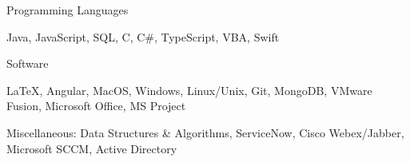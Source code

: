 \begin{cventries}
  \cventry
    {Programming Languages}
    { }
    { }
    { }
    {
      \begin{cvitems}
        \item {Java, JavaScript, SQL, C, C\#, TypeScript, VBA, Swift}
      \end{cvitems}
    }
  \cventry
    {Software}
    { }
    { }
    { }
    {
      \begin{cvitems}
        \item {LaTeX, Angular, MacOS, Windows, Linux/Unix, Git, MongoDB, VMware Fusion, Microsoft Office, MS Project}
        \item {Miscellaneous: Data Structures \& Algorithms, ServiceNow, Cisco Webex/Jabber, Microsoft SCCM, Active Directory }
      \end{cvitems}
    }
\end{cventries}

